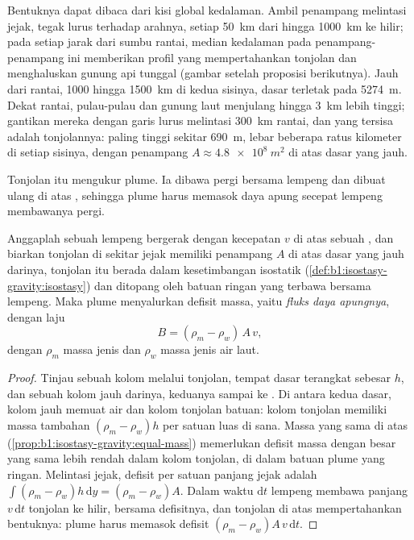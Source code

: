 Bentuknya dapat dibaca dari kisi global kedalaman. Ambil penampang melintasi jejak, tegak lurus terhadap arahnya, setiap \qty{50}{km} dari  hingga \qty{1000}{km} ke hilir; pada setiap jarak dari sumbu rantai, median kedalaman pada penampang-penampang ini memberikan profil yang mempertahankan tonjolan dan menghaluskan gunung api tunggal (gambar setelah proposisi berikutnya). Jauh dari rantai, 1000 hingga \qty{1500}{km} di kedua sisinya, dasar terletak pada \qty{5274}{m}. Dekat rantai, pulau-pulau dan gunung laut menjulang hingga \qty{3}{km} lebih tinggi; gantikan mereka dengan garis lurus melintasi \qty{300}{km} rantai, dan yang tersisa adalah tonjolannya: paling tinggi sekitar \qty{690}{m}, lebar beberapa ratus kilometer di setiap sisinya, dengan penampang $A \approx \qty{4.8e8}{m^2}$ di atas dasar yang jauh.

Tonjolan itu mengukur plume. Ia dibawa pergi bersama lempeng dan dibuat ulang di atas , sehingga plume harus memasok daya apung secepat lempeng membawanya pergi.

\begin{proposition}\label{prop:b1:hotspots:buoyancy}
Anggaplah sebuah lempeng bergerak dengan kecepatan $v$ di atas sebuah , dan biarkan tonjolan di sekitar jejak memiliki penampang $A$ di atas dasar yang jauh darinya, tonjolan itu berada dalam kesetimbangan isostatik (\cref{def:b1:isostasy-gravity:isostasy}) dan ditopang oleh batuan ringan yang terbawa bersama lempeng. Maka plume menyalurkan defisit massa, yaitu \emph{fluks daya apungnya}, dengan laju
\[
  B = (\rho_m - \rho_w)\,A\,v ,
\]
dengan $\rho_m$ massa jenis  dan $\rho_w$ massa jenis air laut.
\end{proposition}

\begin{proof}
Tinjau sebuah kolom melalui tonjolan, tempat dasar terangkat sebesar $h$, dan sebuah kolom jauh
darinya, keduanya sampai ke . Di antara kedua dasar, kolom jauh memuat air dan
kolom tonjolan batuan: kolom tonjolan memiliki massa tambahan $(\rho_m - \rho_w)h$ per satuan
luas di sana. Massa yang sama di atas  (\cref{prop:b1:isostasy-gravity:equal-mass})
memerlukan defisit massa dengan besar yang sama lebih rendah dalam kolom tonjolan, di dalam batuan plume
yang ringan. Melintasi jejak, defisit per satuan panjang jejak adalah
$\int(\rho_m - \rho_w)h\,\mathrm dy = (\rho_m - \rho_w)A$. Dalam waktu
$\mathrm dt$ lempeng membawa panjang $v\,\mathrm dt$ tonjolan ke hilir,
bersama defisitnya, dan tonjolan di atas  mempertahankan bentuknya: plume
harus memasok defisit $(\rho_m - \rho_w)A\,v\,\mathrm dt$.
\end{proof}

